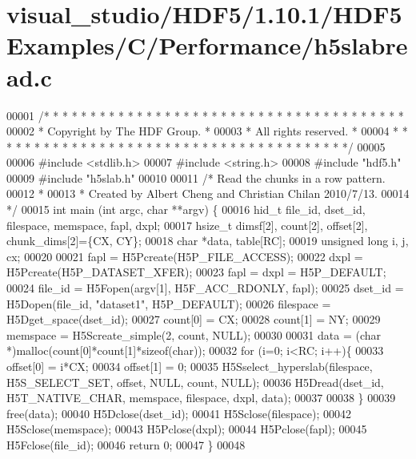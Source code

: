 \hypertarget{visual__studio_2_h_d_f5_21_810_81_2_h_d_f5_examples_2_c_2_performance_2h5slabread_8c_source}{}\section{visual\+\_\+studio/\+H\+D\+F5/1.10.1/\+H\+D\+F5\+Examples/\+C/\+Performance/h5slabread.c}
\label{visual__studio_2_h_d_f5_21_810_81_2_h_d_f5_examples_2_c_2_performance_2h5slabread_8c_source}

\begin{DoxyCode}
00001 \textcolor{comment}{/* * * * * * * * * * * * * * * * * * * * * * * * * * * * * * * * * * * * * * *}
00002 \textcolor{comment}{ * Copyright by The HDF Group.                                               *}
00003 \textcolor{comment}{ * All rights reserved.                                                      *}
00004 \textcolor{comment}{ * * * * * * * * * * * * * * * * * * * * * * * * * * * * * * * * * * * * * * */}
00005 
00006 \textcolor{preprocessor}{#include <stdlib.h>}
00007 \textcolor{preprocessor}{#include <string.h>}
00008 \textcolor{preprocessor}{#include "hdf5.h"}
00009 \textcolor{preprocessor}{#include "h5slab.h"}
00010 
00011 \textcolor{comment}{/* Read the chunks in a row pattern.}
00012 \textcolor{comment}{ *}
00013 \textcolor{comment}{ * Created by Albert Cheng and Christian Chilan 2010/7/13.}
00014 \textcolor{comment}{ */}
00015 \textcolor{keywordtype}{int} main (\textcolor{keywordtype}{int} argc, \textcolor{keywordtype}{char} **argv) \{
00016     hid\_t   file\_id, dset\_id, filespace, memspace, fapl, dxpl;
00017     hsize\_t dimsf[2], count[2], offset[2], chunk\_dims[2]=\{CX, CY\};
00018     \textcolor{keywordtype}{char}    *data, table[RC];               
00019     \textcolor{keywordtype}{unsigned} \textcolor{keywordtype}{long} i, j, cx;
00020 
00021     fapl = H5Pcreate(H5P\_FILE\_ACCESS);
00022     dxpl = H5Pcreate(H5P\_DATASET\_XFER);
00023     fapl = dxpl = H5P\_DEFAULT;
00024     file\_id = H5Fopen(argv[1], H5F\_ACC\_RDONLY, fapl);
00025     dset\_id = H5Dopen(file\_id, \textcolor{stringliteral}{"dataset1"}, H5P\_DEFAULT);
00026     filespace = H5Dget\_space(dset\_id); 
00027     count[0] = CX;
00028     count[1] = NY;
00029     memspace = H5Screate\_simple(2, count, NULL);
00030 
00031     data = (\textcolor{keywordtype}{char} *)malloc(count[0]*count[1]*\textcolor{keyword}{sizeof}(\textcolor{keywordtype}{char}));
00032     \textcolor{keywordflow}{for} (i=0; i<RC; i++)\{
00033         offset[0] = i*CX;
00034         offset[1] = 0;
00035         H5Sselect\_hyperslab(filespace, H5S\_SELECT\_SET, offset, NULL, count, NULL);
00036         H5Dread(dset\_id, H5T\_NATIVE\_CHAR, memspace, filespace, dxpl, data);
00037     
00038     \}
00039     free(data);
00040     H5Dclose(dset\_id);
00041     H5Sclose(filespace);
00042     H5Sclose(memspace);
00043     H5Pclose(dxpl);
00044     H5Pclose(fapl);
00045     H5Fclose(file\_id);
00046     \textcolor{keywordflow}{return} 0;
00047 \}     
00048 
\end{DoxyCode}
